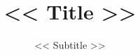 \documentclass[a4paper, 12pt]{scrartcl}
\title{<< Title >>}
\subtitle{<< Subtitle >>}
\begin{document}
\maketitle
\tableofcontents
\listoffigures
\pagebreak
\end{document}
